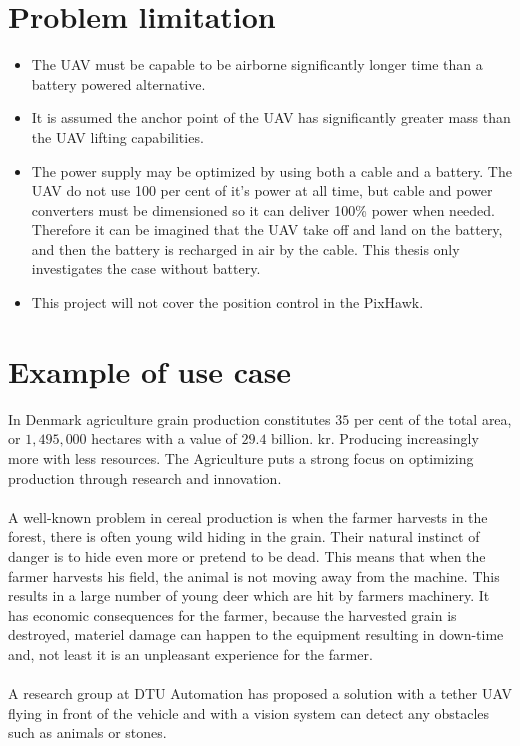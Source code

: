 \section{Problem limitation}
\begin{itemize}
\item The UAV must be capable to be airborne significantly longer time than a battery powered alternative.
\item It is assumed the anchor point of the UAV has significantly greater mass than the UAV lifting capabilities.
\item The power supply may be optimized by using both a cable and a battery. The UAV do not use 100 per cent of it's power at all time, but cable and power converters must be dimensioned so it can deliver 100\% power when needed. Therefore it can be imagined that the UAV take off and land on the battery, and then the battery is recharged in air by the cable. This thesis only investigates the case without battery.
\item This project will not cover the position control in the PixHawk. 
\end{itemize}


\section{Example of use case}

In Denmark agriculture grain production constitutes $35$ per cent of the total area, or $1,495,000$ hectares with a value of $29.4$ billion. kr. Producing increasingly more with less resources. The Agriculture puts a strong focus on optimizing production through research and innovation\cite{FødevarerLandbrug2013}.
\\
\\
A well-known problem in cereal production is when the farmer harvests in the forest, there is often young wild hiding in the grain. Their natural instinct of danger is to hide even more or pretend to be dead. This means that when the farmer harvests his field, the animal is not moving away from the machine. This results in a large number of young deer which are hit by farmers machinery. It has economic consequences for the farmer, because the harvested grain is destroyed, materiel damage can happen to the equipment resulting in down-time and, not least it is an unpleasant experience for the farmer.
\\
\\
A research group at DTU Automation has proposed a solution with a tether UAV flying in front of the vehicle and with a vision system can detect any obstacles such as animals or stones.

